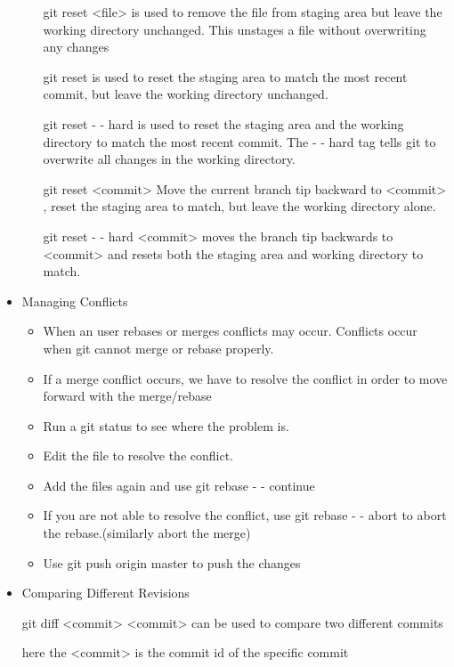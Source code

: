 \documentclass{article}
\begin{document}
\begin{itemize}
\begin{itemize}
\hspace{10mm} git reset <file> is used to remove the file from staging area but leave the working directory unchanged. This unstages a file without overwriting any changes

\hspace{10mm} git reset is used to reset the staging area to match the most recent commit, but leave the working directory unchanged.

\hspace{10mm} git reset - - hard is used to reset the staging area and the working directory to match the most recent commit.  The - - hard tag tells git to overwrite all changes in the working directory.

\hspace{10mm} git reset <commit> Move the current branch tip backward to <commit> , reset the staging area to match, but leave the working directory alone.

\hspace{10mm} git reset - - hard <commit> moves the branch tip backwards to <commit> and resets both the staging area and working directory to match.


\end{itemize}


\item Managing Conflicts

\begin{itemize}
\item When an user rebases or merges conflicts may occur. Conflicts occur when git cannot merge or rebase properly.
\item If a merge conflict occurs, we have to resolve the conflict in order to move forward with the merge/rebase
\item Run a git status to see where the problem is.
\item Edit the file to resolve the conflict.
\item Add the files again and use git rebase - - continue
\item If you are not able to resolve the conflict, use git rebase - - abort to abort the rebase.(similarly abort the merge)
\item Use git push origin master to push the changes
\end{itemize}

\item Comparing Different Revisions

\hspace{10mm} git diff <commit> <commit> can be used to compare two different commits

\hspace{10mm} here the <commit> is the commit id of the specific commit

\end{itemize}
\end{document}
